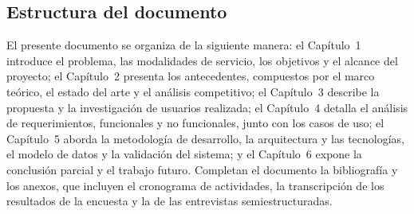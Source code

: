 \subsection{Estructura del documento}

El presente documento se organiza de la siguiente manera: el Capítulo~1 introduce el problema, las modalidades de servicio, los objetivos y el alcance del proyecto; el Capítulo~2 presenta los antecedentes, compuestos por el marco teórico, el estado del arte y {\color{nuevo}el análisis competitivo}; el Capítulo~3 describe la propuesta y la investigación de usuarios realizada; {\color{nuevo}el Capítulo~4 detalla el análisis de requerimientos, funcionales y no funcionales, junto con los casos de uso; el Capítulo~5 aborda la metodología de desarrollo, la arquitectura y las tecnologías, el modelo de datos y la validación del sistema; y el Capítulo~6} expone la conclusión parcial y el trabajo futuro. Completan el documento la bibliografía y los anexos, que incluyen el cronograma de actividades{\color{nuevo}, la transcripción de los resultados de la encuesta y la de las entrevistas semiestructuradas}.